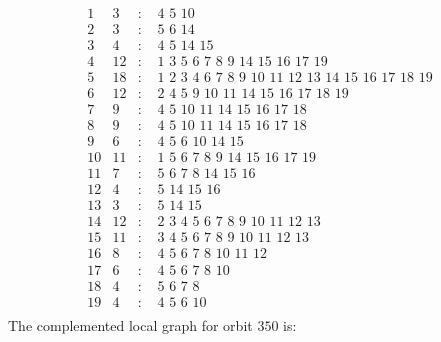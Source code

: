 \documentclass[12pt]{article}
\begin{document}
\begin{equation*}
\begin{array}{rrcl}
1&3&:&\,\,4\,\,5\,\,10\\
2&3&:&\,\,5\,\,6\,\,14\\
3&4&:&\,\,4\,\,5\,\,14\,\,15\\
4&12&:&\,\,1\,\,3\,\,5\,\,6\,\,7\,\,8\,\,9\,\,14\,\,15\,\,16\,\,17\,\,19\\
5&18&:&\,\,1\,\,2\,\,3\,\,4\,\,6\,\,7\,\,8\,\,9\,\,10\,\,11\,\,12\,\,13\,\,14\,\,15\,\,16\,\,17\,\,18\,\,19\\
6&12&:&\,\,2\,\,4\,\,5\,\,9\,\,10\,\,11\,\,14\,\,15\,\,16\,\,17\,\,18\,\,19\\
7&9&:&\,\,4\,\,5\,\,10\,\,11\,\,14\,\,15\,\,16\,\,17\,\,18\\
8&9&:&\,\,4\,\,5\,\,10\,\,11\,\,14\,\,15\,\,16\,\,17\,\,18\\
9&6&:&\,\,4\,\,5\,\,6\,\,10\,\,14\,\,15\\
10&11&:&\,\,1\,\,5\,\,6\,\,7\,\,8\,\,9\,\,14\,\,15\,\,16\,\,17\,\,19\\
11&7&:&\,\,5\,\,6\,\,7\,\,8\,\,14\,\,15\,\,16\\
12&4&:&\,\,5\,\,14\,\,15\,\,16\\
13&3&:&\,\,5\,\,14\,\,15\\
14&12&:&\,\,2\,\,3\,\,4\,\,5\,\,6\,\,7\,\,8\,\,9\,\,10\,\,11\,\,12\,\,13\\
15&11&:&\,\,3\,\,4\,\,5\,\,6\,\,7\,\,8\,\,9\,\,10\,\,11\,\,12\,\,13\\
16&8&:&\,\,4\,\,5\,\,6\,\,7\,\,8\,\,10\,\,11\,\,12\\
17&6&:&\,\,4\,\,5\,\,6\,\,7\,\,8\,\,10\\
18&4&:&\,\,5\,\,6\,\,7\,\,8\\
19&4&:&\,\,4\,\,5\,\,6\,\,10\\
\end{array}
\end{equation*}
The complemented local graph for orbit $350$ is:
\end{document}
